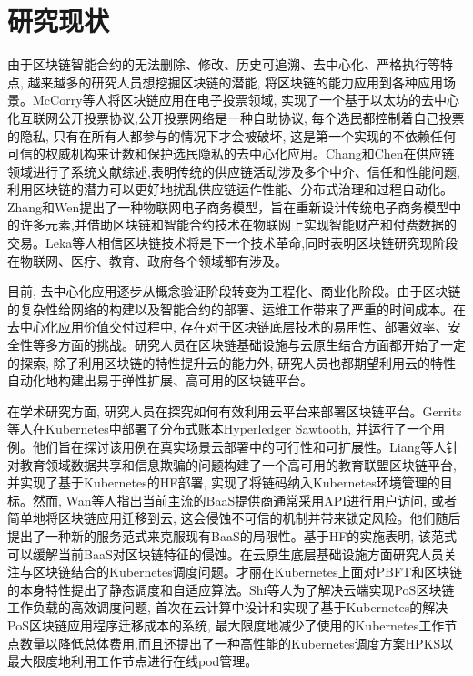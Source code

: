 \section{研究现状}

由于区块链智能合约的无法删除、修改、历史可追溯、去中心化、严格执行等特点, 越来越多的研究人员想挖掘区块链的潜能, 将区块链的能力应用到各种应用场景。McCorry等人\cite{mccorry2017smart}将区块链应用在电子投票领域, 实现了一个基于以太坊的去中心化互联网公开投票协议,公开投票网络是一种自助协议, 每个选民都控制着自己投票的隐私, 只有在所有人都参与的情况下才会被破坏, 这是第一个实现的不依赖任何可信的权威机构来计数和保护选民隐私的去中心化应用。Chang和Chen\cite{chang2020blockchain}在供应链领域进行了系统文献综述,表明传统的供应链活动涉及多个中介、信任和性能问题,利用区块链的潜力可以更好地扰乱供应链运作性能、分布式治理和过程自动化。Zhang和Wen\cite{zhang2017iot}提出了一种物联网电子商务模型，旨在重新设计传统电子商务模型中的许多元素,并借助区块链和智能合约技术在物联网上实现智能财产和付费数据的交易。Leka等人\cite{leka2019systematic}相信区块链技术将是下一个技术革命,同时表明区块链研究现阶段在物联网\cite{christidis2016blockchains}、医疗、教育、政府各个领域都有涉及。

目前, 去中心化应用逐步从概念验证阶段转变为工程化、商业化阶段。由于区块链的复杂性给网络的构建以及智能合约的部署、运维工作带来了严重的时间成本。在去中心化应用价值交付过程中, 存在对于区块链底层技术的易用性、部署效率、安全性等多方面的挑战。研究人员在区块链基础设施与云原生结合方面都开始了一定的探索, 除了利用区块链的特性提升云的能力外\cite{DBLP:journals/comcom/XieZZWH21}\cite{DBLP:conf/smartcloud/SunWY20}\cite{8457813}, 研究人员也都期望利用云的特性自动化地构建出易于弹性扩展、高可用的区块链平台。

在学术研究方面, 研究人员在探究如何有效利用云平台来部署区块链平台。Gerrits等人\cite{DBLP:conf/coins/GerritsKKFV21}在Kubernetes中部署了分布式账本Hyperledger Sawtooth\footnotemark[1], 并运行了一个用例。他们旨在探讨该用例在真实场景云部署中的可行性和可扩展性。Liang等人\cite{liangeduchain}针对教育领域数据共享和信息欺骗的问题构建了一个高可用的教育联盟区块链平台, 并实现了基于Kubernetes的HF部署, 实现了将链码纳入Kubernetes环境管理的目标。然而, Wan等人\cite{wan2018novel}指出当前主流的BaaS提供商通常采用API进行用户访问, 或者简单地将区块链应用迁移到云, 这会侵蚀不可信的机制并带来锁定风险。他们随后提出了一种新的服务范式来克服现有BaaS的局限性。基于HF的实施表明, 该范式可以缓解当前BaaS对区块链特征的侵蚀。在云原生底层基础设施方面研究人员关注与区块链结合的Kubernetes调度问题。才丽\cite{caili2018}在Kubernetes上面对PBFT和区块链的本身特性提出了静态调度和自适应算法。Shi等人\cite{9582270}为了解决云端实现PoS区块链工作负载的高效调度问题, 首次在云计算中设计和实现了基于Kubernetes的解决PoS区块链应用程序迁移成本的系统, 最大限度地减少了使用的Kubernetes工作节点数量以降低总体费用,而且还提出了一种高性能的Kubernetes调度方案HPKS以最大限度地利用工作节点进行在线pod管理。

